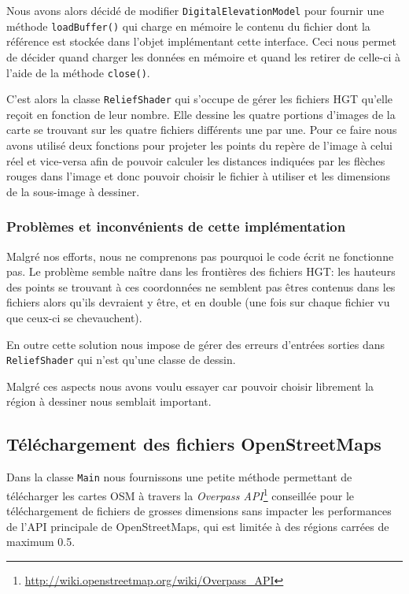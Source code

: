 \documentclass[11pt,a4paper]{article}
\begin{document}
Nous avons alors décidé de modifier \texttt{DigitalElevationModel} pour fournir une méthode \texttt{loadBuffer()} qui charge en mémoire le contenu du fichier dont la référence est stockée dans l'objet implémentant cette interface. Ceci nous permet de décider quand charger les données en mémoire et quand les retirer de celle-ci à l'aide de la méthode \texttt{close()}.

C'est alors la classe \texttt{ReliefShader} qui s'occupe de gérer les fichiers HGT qu'elle reçoit en fonction de leur nombre. Elle dessine les quatre portions d'images de la carte se trouvant sur les quatre fichiers différents une par une. Pour ce faire nous avons utilisé deux fonctions pour projeter les points du repère de l'image à celui réel et vice-versa afin de pouvoir calculer les distances indiquées par les flèches rouges dans l'image et donc pouvoir choisir le fichier à utiliser et les dimensions de la sous-image à dessiner.

\subsubsection*{Problèmes et inconvénients de cette implémentation}
Malgré nos efforts, nous ne comprenons pas pourquoi le code écrit ne fonctionne pas. Le problème semble naître dans les frontières des fichiers HGT: les hauteurs des points se trouvant à ces coordonnées ne semblent pas êtres contenus dans les fichiers alors qu'ils devraient y être, et en double (une fois sur chaque fichier vu que ceux-ci se chevauchent).

En outre cette solution nous impose de gérer des erreurs d'entrées sorties dans \texttt{ReliefShader} qui n'est qu'une classe de dessin.

Malgré ces aspects nous avons voulu essayer car pouvoir choisir librement la région à dessiner nous semblait important.

\subsection{Téléchargement des fichiers OpenStreetMaps}
Dans la classe \texttt{Main} nous fournissons une petite méthode permettant de télécharger les cartes OSM à travers la \textit{Overpass API}\footnote{\url{http://wiki.openstreetmap.org/wiki/Overpass_API}} conseillée pour le téléchargement de fichiers de grosses dimensions sans impacter les performances de l'API principale de OpenStreetMaps, qui est limitée à des régions carrées de maximum 0.5\degre.
\end{document}
